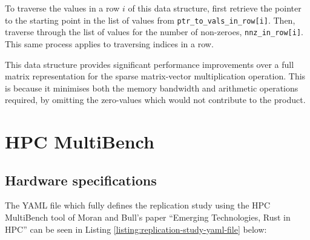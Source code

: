 To traverse the values in a row $i$ of this data structure, first retrieve the pointer to the starting point in the list of values from \texttt{ptr\_to\_vals\_in\_row[i]}. Then, traverse through the list of values for the number of non-zeroes, \texttt{nnz\_in\_row[i]}. This same process applies to traversing indices in a row.

This data structure provides significant performance improvements over a full matrix representation for the sparse matrix-vector multiplication operation. This is because it minimises both the memory bandwidth and arithmetic operations required, by omitting the zero-values which would not contribute to the product.









\chapter{HPC MultiBench}
\label{ch:tooling-appendix}

\section{Hardware specifications}
\label{sec:tooling-replication-yaml}

The YAML file which fully defines the replication study using the HPC MultiBench tool of Moran and Bull's paper ``Emerging Technologies, Rust in HPC'' \cite{moranEmergingTechnologiesRust2023} can be seen in Listing \ref{listing:replication-study-yaml-file} below:

